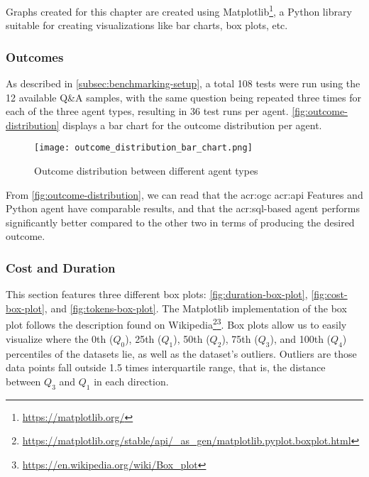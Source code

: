 Graphs created for this chapter are created using Matplotlib\footnote{\url{https://matplotlib.org/}}, a Python library suitable for creating visualizations like bar charts, box plots, etc.

\subsubsection{Outcomes}

As described in \autoref{subsec:benchmarking-setup}, a total 108 tests were run using the 12 available Q\&A samples, with the same question being repeated three times for each of the three agent types, resulting in 36 test runs per agent. \autoref{fig:outcome-distribution} displays a bar chart for the outcome distribution per agent.


\begin{figure}[htbp]
    \centering
    \texttt{[image: outcome\_distribution\_bar\_chart.png]}
    \caption{Outcome distribution between different agent types}
    \label{fig:outcome-distribution}
\end{figure}

From \autoref{fig:outcome-distribution}, we can read that the \acrshort{acr:ogc} \acrshort{acr:api} Features and Python agent have comparable results, and that the \acrshort{acr:sql}-based agent performs significantly better compared to the other two in terms of producing the desired outcome.

\subsubsection{Cost and Duration}

This section features three different box plots: \autoref{fig:duration-box-plot}, \autoref{fig:cost-box-plot}, and \autoref{fig:tokens-box-plot}. The Matplotlib implementation of the box plot follows the description found on Wikipedia\footnote{\url{https://matplotlib.org/stable/api/_as_gen/matplotlib.pyplot.boxplot.html}}\footnote{\url{https://en.wikipedia.org/wiki/Box_plot}}. Box plots allow us to easily visualize where the 0th ($Q_0$), 25th ($Q_1$), 50th ($Q_2$), 75th ($Q_3$), and 100th ($Q_4$) percentiles of the datasets lie, as well as the dataset's outliers. Outliers are those data points fall outside 1.5 times interquartile range, that is, the distance between $Q_3$ and $Q_1$ in each direction.

